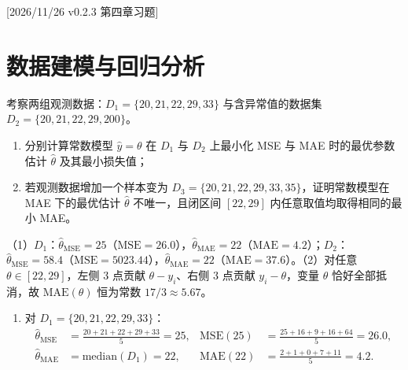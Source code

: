 %
%
[2026/11/26 v0.2.3 第四章习题]
\section{数据建模与回归分析}

\begin{exercise}[title={常数模型在 MSE 与 MAE 下的异常值对比},level=basic,points=12,tags={常数模型,MSE,MAE,鲁棒性}]
考察两组观测数据：$D_1 = \{20, 21, 22, 29, 33\}$ 与含异常值的数据集 $D_2 = \{20, 21, 22, 29, 200\}$。
\begin{enumerate}
  \item 分别计算常数模型 $\hat{y} = \theta$ 在 $D_1$ 与 $D_2$ 上最小化 MSE 与 MAE 时的最优参数估计 $\hat{\theta}$ 及其最小损失值；
  \item 若观测数据增加一个样本变为 $D_3 = \{20, 21, 22, 29, 33, 35\}$，证明常数模型在 MAE 下的最优估计 $\hat{\theta}$ 不唯一，且闭区间 $[22, 29]$ 内任意取值均取得相同的最小 MAE。
\end{enumerate}
\begin{answer}
（1）$D_1$：$\hat{\theta}_{\mathrm{MSE}}=25$（$\mathrm{MSE}=26.0$），$\hat{\theta}_{\mathrm{MAE}}=22$（$\mathrm{MAE}=4.2$）；$D_2$：$\hat{\theta}_{\mathrm{MSE}}=58.4$（$\mathrm{MSE}=5023.44$），$\hat{\theta}_{\mathrm{MAE}}=22$（$\mathrm{MAE}=37.6$）。（2）对任意 $\theta\in[22,29]$，左侧 $3$ 点贡献 $\theta-y_i$、右侧 $3$ 点贡献 $y_i-\theta$，变量 $\theta$ 恰好全部抵消，故 $\mathrm{MAE}(\theta)$ 恒为常数 $17/3\approx 5.67$。
\end{answer}
\begin{solution}
\begin{enumerate}
  \item 对 $D_1 = \{20, 21, 22, 29, 33\}$：
  \[\begin{aligned}
    \hat{\theta}_{\mathrm{MSE}} &= \frac{20+21+22+29+33}{5} = 25, &
    \mathrm{MSE}(25) &= \frac{25+16+9+16+64}{5} = 26.0,\\
    \hat{\theta}_{\mathrm{MAE}} &= \mathrm{median}(D_1) = 22, &
    \mathrm{MAE}(22) &= \frac{2+1+0+7+11}{5} = 4.2.
  \end{aligned}\]

\end{enumerate}
\end{solution}
\end{exercise}
